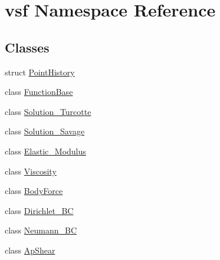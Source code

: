 \hypertarget{namespacevsf}{\section{vsf Namespace Reference}
\label{namespacevsf}
}
\subsection*{Classes}
\begin{DoxyCompactItemize}
\item 
struct \hyperlink{structvsf_1_1PointHistory}{Point\-History}
\item 
class \hyperlink{classvsf_1_1FunctionBase}{Function\-Base}
\item 
class \hyperlink{classvsf_1_1Solution__Turcotte}{Solution\-\_\-\-Turcotte}
\item 
class \hyperlink{classvsf_1_1Solution__Savage}{Solution\-\_\-\-Savage}
\item 
class \hyperlink{classvsf_1_1Elastic__Modulus}{Elastic\-\_\-\-Modulus}
\item 
class \hyperlink{classvsf_1_1Viscosity}{Viscosity}
\item 
class \hyperlink{classvsf_1_1BodyForce}{Body\-Force}
\item 
class \hyperlink{classvsf_1_1Dirichlet__BC}{Dirichlet\-\_\-\-B\-C}
\item 
class \hyperlink{classvsf_1_1Neumann__BC}{Neumann\-\_\-\-B\-C}
\item 
class \hyperlink{classvsf_1_1ApShear}{Ap\-Shear}
\end{DoxyCompactItemize}

